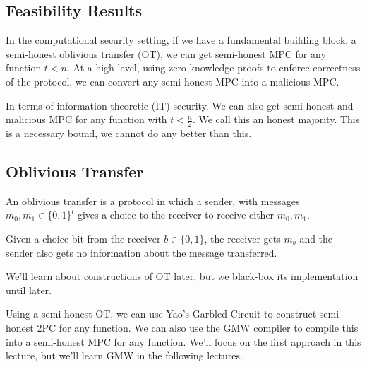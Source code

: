 \subsection{Feasibility Results}
In the computational security setting, if we have a fundamental building block, a semi-honest oblivious transfer (OT), we can get semi-honest MPC for any function $t<n$. At a high level, using zero-knowledge proofs to enforce correctness of the protocol, we can convert any semi-honest MPC into a malicious MPC.

In terms of information-theoretic (IT) security. We can also get semi-honest and malicious MPC for any function with $t < \frac{n}{2}$. We call this an \ul{honest majority}. This is a necessary bound, we cannot do any better than this.

\subsection{Oblivious Transfer}
\begin{definition}
    An \ul{oblivious transfer} is a protocol in which a sender, with messages $m_0, m_1\in\{0, 1\}^l$ gives a choice to the receiver to receive either $m_0, m_1$.

    Given a choice bit from the receiver $b\in\{0,1\}$, the receiver gets $m_b$ and the sender also gets no information about the message transferred.


\end{definition}

We'll learn about constructions of OT later, but we black-box its implementation until later.

Using a semi-honest OT, we can use Yao's Garbled Circuit to construct semi-honest 2PC for any function. We can also use the GMW compiler to compile this into a semi-honest MPC for any function. We'll focus on the first approach in this lecture, but we'll learn GMW in the following lectures.

